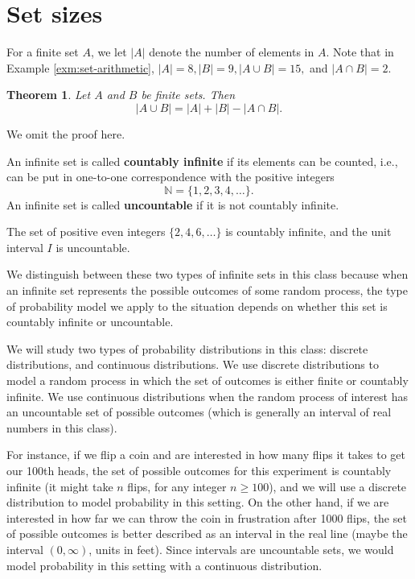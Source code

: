 \documentclass[
]{book}
\newtheorem{theorem}{Theorem}[chapter]
\theoremstyle{definition}
\theoremstyle{definition}
\theoremstyle{definition}
\theoremstyle{definition}
\theoremstyle{remark}
\begin{document}
\section{Set sizes}\label{size-of-sets}

For a finite set \(A\), we let \(|A|\) denote the number of elements in \(A\).
Note that in Example \ref{exm:set-arithmetic}, \(|A| = 8, |B| = 9, |A \cup B| = 15,\) and \(|A \cap B| = 2\).

\begin{theorem}
\protect\hypertarget{thm:AuB-size}{}\label{thm:AuB-size}Let \(A\) and \(B\) be finite sets. Then \[|A \cup B| = |A| + |B| - |A \cap B|.\]
\end{theorem}

We omit the proof here.

An infinite set is called \textbf{countably infinite} if its elements can be counted, i.e., can be put in one-to-one correspondence with the positive integers \[\mathbb{N} = \{1, 2, 3, 4, \ldots\}.\] An infinite set is called \textbf{uncountable} if it is not countably infinite.

The set of positive even integers \(\{2, 4, 6, \ldots \}\) is countably infinite, and the unit interval \(I\) is uncountable.

We distinguish between these two types of infinite sets in this class because when an infinite set represents the possible outcomes of some random process, the type of probability model we apply to the situation depends on whether this set is countably infinite or uncountable.

We will study two types of probability distributions in this class: discrete distributions, and continuous distributions. We use discrete distributions to model a random process in which the set of outcomes is either finite or countably infinite. We use continuous distributions when the random process of interest has an uncountable set of possible outcomes (which is generally an interval of real numbers in this class).

For instance, if we flip a coin and are interested in how many flips it takes to get our 100th heads, the set of possible outcomes for this experiment is countably infinite (it might take \(n\) flips, for any integer \(n \geq 100\)), and we will use a discrete distribution to model probability in this setting. On the other hand, if we are interested in how far we can throw the coin in frustration after 1000 flips, the set of possible outcomes is better described as an interval in the real line (maybe the interval \((0,\infty)\), units in feet). Since intervals are uncountable sets, we would model probability in this setting with a continuous distribution.
\end{document}
